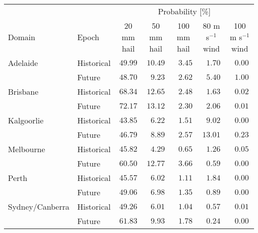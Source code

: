 \begin{tabular}{llccccc}
\hline
& & \multicolumn{5}{c}{Probability [\%]} \\ 
Domain & Epoch & 20 mm hail & 50 mm hail & 100 mm hail & 80 m s$^{-1}$ wind & \multicolumn{1}{c}{100 m s$^{-1}$ wind} \\ 
\hline
Adelaide & Historical  & $49.99$ & $10.49$ & $\phantom{0}3.45$ & $\phantom{0}1.70$ & $\phantom{0}0.00$ \\
 & Future  & $48.70$ & $\phantom{0}9.23$ & $\phantom{0}2.62$ & $\phantom{0}5.40$ & $\phantom{0}1.00$ \\
Brisbane & Historical  & $68.34$ & $12.65$ & $\phantom{0}2.48$ & $\phantom{0}1.63$ & $\phantom{0}0.02$ \\
 & Future  & $72.17$ & $13.12$ & $\phantom{0}2.30$ & $\phantom{0}2.06$ & $\phantom{0}0.01$ \\
Kalgoorlie & Historical  & $43.85$ & $\phantom{0}6.22$ & $\phantom{0}1.51$ & $\phantom{0}9.02$ & $\phantom{0}0.00$ \\
 & Future  & $46.79$ & $\phantom{0}8.89$ & $\phantom{0}2.57$ & $13.01$ & $\phantom{0}0.23$ \\
Melbourne & Historical  & $45.82$ & $\phantom{0}4.29$ & $\phantom{0}0.65$ & $\phantom{0}1.26$ & $\phantom{0}0.05$ \\
 & Future  & $60.50$ & $12.77$ & $\phantom{0}3.66$ & $\phantom{0}0.59$ & $\phantom{0}0.00$ \\
Perth & Historical  & $45.57$ & $\phantom{0}6.02$ & $\phantom{0}1.11$ & $\phantom{0}1.84$ & $\phantom{0}0.00$ \\
 & Future  & $49.06$ & $\phantom{0}6.98$ & $\phantom{0}1.35$ & $\phantom{0}0.89$ & $\phantom{0}0.00$ \\
Sydney/Canberra & Historical  & $49.26$ & $\phantom{0}6.01$ & $\phantom{0}1.04$ & $\phantom{0}0.57$ & $\phantom{0}0.01$ \\
 & Future  & $61.83$ & $\phantom{0}9.93$ & $\phantom{0}1.78$ & $\phantom{0}0.24$ & $\phantom{0}0.00$ \\
\hline 
\end{tabular}

